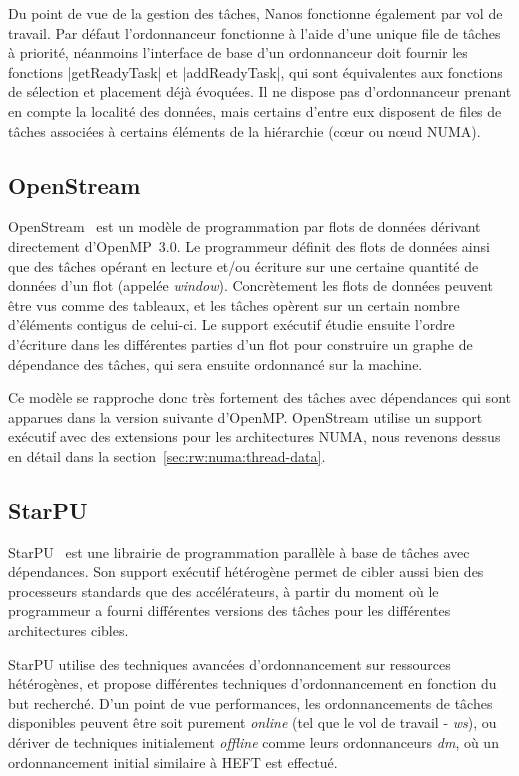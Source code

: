 Du point de vue de la gestion des tâches, Nanos fonctionne également par vol de travail.
Par défaut l'ordonnanceur fonctionne à l'aide d'une unique file de tâches à priorité, néanmoins l'interface de base d'un ordonnanceur doit fournir les fonctions |getReadyTask| et |addReadyTask|, qui sont équivalentes aux fonctions de sélection et placement déjà évoquées.
Il ne dispose pas d'ordonnanceur prenant en compte la localité des données, mais certains d'entre eux disposent de files de tâches associées à certains éléments de la hiérarchie (cœur ou nœud NUMA).


\subsection{OpenStream}

OpenStream~\cite{Pop2013} est un modèle de programmation par flots de données dérivant directement d'OpenMP~3.0.
Le programmeur définit des flots de données ainsi que des tâches opérant en lecture et/ou écriture sur une certaine quantité de données d'un flot (appelée \emph{window}).
Concrètement les flots de données peuvent être vus comme des tableaux, et les tâches opèrent sur un certain nombre d'éléments contigus de celui-ci.
Le support exécutif étudie ensuite l'ordre d'écriture dans les différentes parties d'un flot pour construire un graphe de dépendance des tâches, qui sera ensuite ordonnancé sur la machine.

Ce modèle se rapproche donc très fortement des tâches avec dépendances qui sont apparues dans la version suivante d'OpenMP.
OpenStream utilise un support exécutif avec des extensions pour les architectures NUMA, nous revenons dessus en détail dans la section~\ref{sec:rw:numa:thread-data}.

\subsection{StarPU}

StarPU~\cite{StarPU} est une librairie de programmation parallèle à base de tâches avec dépendances.
Son support exécutif hétérogène permet de cibler aussi bien des processeurs standards que des accélérateurs, à partir du moment où le programmeur a fourni différentes versions des tâches pour les différentes architectures cibles.

StarPU utilise des techniques avancées d'ordonnancement sur ressources hétérogènes, et propose différentes techniques d'ordonnancement en fonction du but recherché.
D'un point de vue performances, les ordonnancements de tâches disponibles peuvent être soit purement \emph{online} (tel que le vol de travail - \emph{ws}), ou dériver de techniques initialement \emph{offline} comme leurs ordonnanceurs \emph{dm}, où un ordonnancement initial similaire à HEFT est effectué.

